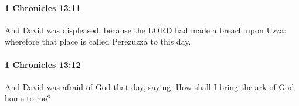 		\paragraph{1 Chronicles 13:11} %
			\label{1CHRONICLES-13-11}

			And David was displeased, because the LORD had made a breach upon Uzza: wherefore that place is called Perezuzza to this day.


		\paragraph{1 Chronicles 13:12} %
			\label{1CHRONICLES-13-12}

			And David was afraid of God that day, saying, How shall I bring the ark of God home to me?


